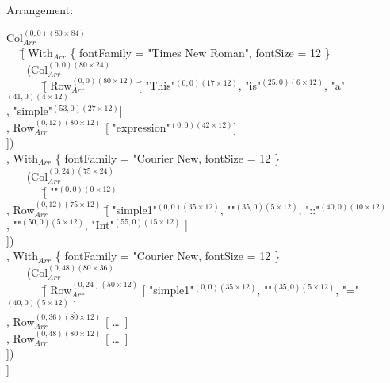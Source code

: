 Arrangement:
\small \ttfamily
\begin{tabbing}
Col$_{Arr}^{(0,0)(80\times84)}$ \\
~~ \= [ With$_{Arr}$ \{ fontFamily = "Times New Roman", fontSize = 12 \}\\
      \> ~~~ (Col$_{Arr}^{(0,0)(80\times24)}$ \\
      \> ~~~~~~ \= [ Row$_{Arr}^{(0,0)(80\times12)}$ \= [ "This"$^{(0,0)(17\times12)}$, "is"$^{(25,0)(6\times12)}$, "a"$^{(41,0)(4\times12)}$ \\
      \>       \>                                                      \>, "simple"$^{(53,0)(27\times12)}$]\\
      \>       \> , Row$_{Arr}^{(0,12)(80\times12)}$  [ "expression"$^{(0,0)(42\times12)}$]\\
      \>       \> ])\\
                    
      \> , With$_{Arr}$ \{ fontFamily = "Courier New,  fontSize = 12 \}\\
      \> ~~~ (Col$_{Arr}^{(0,24)(75\times24)}$\\
      \> ~~~~~~ \= [ ""$^{(0,0)(0\times12)}$\\
      \>      \> , Row$_{Arr}^{(0,12)(75\times12)}$ \= [ "simple1"$^{(0,0)(35\times12)}$, "\textvisiblespace"$^{(35,0)(5\times12)}$, "::"$^{(40,0)(10\times12)}$\\
      \>      \>                                                      \> , "\textvisiblespace"$^{(50,0)(5\times12)}$, "Int"$^{(55,0)(15\times12)}$ ]\\

      \>      \>  ])\\
                    
      \> , With$_{Arr}$ \{ fontFamily = "Courier New,  fontSize = 12 \}\\
      \> ~~~ (Col$_{Arr}^{(0,48)(80\times36)}$\\
      \> ~~~~~~ \= [  Row$_{Arr}^{(0,24)(50\times12)}$ [ "simple1"$^{(0,0)(35\times12)}$, "\textvisiblespace"$^{(35,0)(5\times12)}$, "="$^{(40,0)(5\times12)}$ ]\\
      \>      \> , Row$_{Arr}^{(0,36)(80\times12)}$ [ \dots~]\\
      \>      \> , Row$_{Arr}^{(0,48)(80\times12)}$ [ \dots~]\\
      \>      \> ])\\
      \> ]

\end{tabbing}
\rmfamily \normalsize


